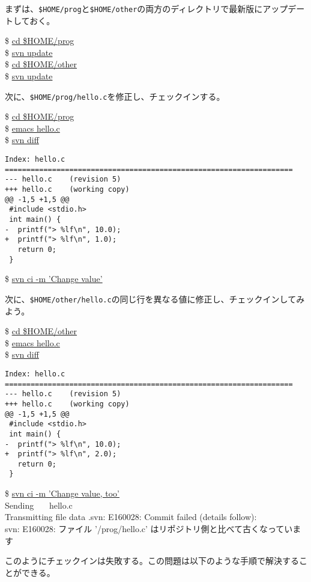 \documentclass[a4j]{jsbook}
\newcommand{\prompt}{\$ }
\newenvironment{commandline2}{%
  \begin{tcolorbox}\tt%
}{%
  \end{tcolorbox}%
}
\begin{document}
まずは、{\tt \$HOME/prog}と{\tt \$HOME/other}の両方のディレクトリで最新版にアップデートしておく。
\begin{commandline2}
\prompt \underline{cd \$HOME/prog} \\
\prompt \underline{svn update} \\
\prompt \underline{cd \$HOME/other} \\
\prompt \underline{svn update}
\end{commandline2} \noindent
次に、{\tt \$HOME/prog/hello.c}を修正し、チェックインする。
\begin{commandline2}
\prompt \underline{cd \$HOME/prog} \\
\prompt \underline{emacs hello.c} \\
\prompt \underline{svn diff}
\vspace*{-.7em} 
\begin{verbatim}
Index: hello.c
===================================================================
--- hello.c    (revision 5)
+++ hello.c    (working copy)
@@ -1,5 +1,5 @@
 #include <stdio.h>
 int main() {
-  printf("> %lf\n", 10.0);
+  printf("> %lf\n", 1.0);
   return 0;
 }
\end{verbatim}
\vspace*{-.7em} 
\prompt \underline{svn ci -m 'Change value'}
\end{commandline2} \noindent
次に、{\tt \$HOME/other/hello.c}の同じ行を異なる値に修正し、チェックインしてみよう。
\begin{commandline2}
\prompt \underline{cd \$HOME/other} \\
\prompt \underline{emacs hello.c} \\
\prompt \underline{svn diff}
\vspace*{-.7em} 
\begin{verbatim}
Index: hello.c
===================================================================
--- hello.c    (revision 5)
+++ hello.c    (working copy)
@@ -1,5 +1,5 @@
 #include <stdio.h>
 int main() {
-  printf("> %lf\n", 10.0);
+  printf("> %lf\n", 2.0);
   return 0;
 }
\end{verbatim}
\vspace*{-.7em} 
\prompt \underline{svn ci -m 'Change value, too'} \\
Sending \ \ \ hello.c \\
Transmitting file data .svn: E160028: Commit failed (details follow): \\
svn: E160028: ファイル '/prog/hello.c' はリポジトリ側と比べて古くなっています
\end{commandline2} \noindent
このようにチェックインは失敗する。この問題は以下のような手順で解決することができる。
\end{document}
